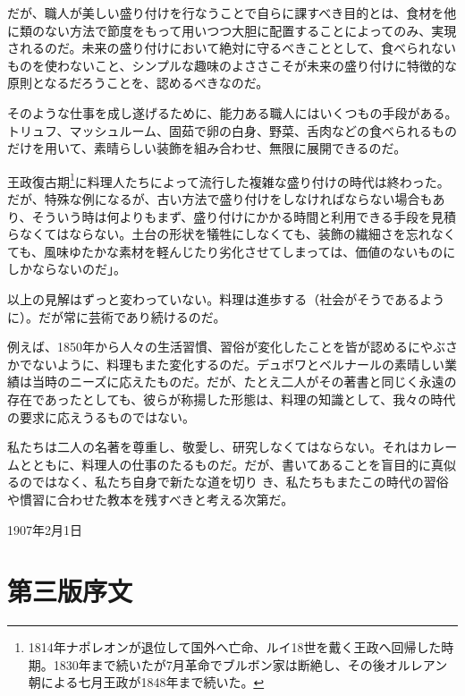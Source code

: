 だが、職人が美しい盛り付けを行なうことで自らに課すべき目的とは、食材を他に類のない方法で節度をもって用いつつ大胆に配置することによってのみ、実現されるのだ。未来の盛り付けにおいて絶対に守るべきこととして、食べられないものを使わないこと、シンプルな趣味のよささこそが未来の盛り付けに特徴的な原則となるだろうことを、認めるべきなのだ。

そのような仕事を成し遂げるために、能力ある職人にはいくつもの手段がある。トリュフ、マッシュルーム、固茹で卵の白身、野菜、舌肉などの食べられるものだけを用いて、素晴らしい装飾を組み合わせ、無限に展開できるのだ。

王政復古期\footnote{1814年ナポレオンが退位して国外へ亡命、ルイ18世を戴く王政へ回帰した時期。1830年まで続いたが7月革命でブルボン家は断絶し、その後オルレアン朝による七月王政が1848年まで続いた。}に料理人たちによって流行した複雑な盛り付けの時代は終わった。だが、特殊な例になるが、古い方法で盛り付けをしなければならない場合もあり、そういう時は何よりもまず、盛り付けにかかる時間と利用できる手段を見積らなくてはならない。土台の形状を犠牲にしなくても、装飾の繊細さを忘れなくても、風味ゆたかな素材を軽んじたり劣化させてしまっては、価値のないものにしかならないのだ」。

以上の見解はずっと変わっていない。料理は進歩する（社会がそうであるように）。だが常に芸術であり続けるのだ。

例えば、1850年から人々の生活習慣、習俗が変化したことを皆が認めるにやぶさかでないように、料理もまた変化するのだ。デュボワとベルナールの素晴しい業績は当時のニーズに応えたものだ。だが、たとえ二人がその著書と同じく永遠の存在であったとしても、彼らが称揚した形態は、料理の知識として、我々の時代の要求に応えうるものではない。

私たちは二人の名著を尊重し、敬愛し、研究しなくてはならない。それはカレームとともに、料理人の仕事のたるものだ。だが、書いてあることを盲目的に真似るのではなく、私たち自身で新たな道を切り
き、私たちもまたこの時代の習俗や慣習に合わせた教本を残すべきと考える次第だ。

\begin{flushright}
1907年2月1日
\end{flushright}

\newpage

\hypertarget{introduction-troisieme-edition}{%
\section{第三版序文}\label{introduction-troisieme-edition}}

\vspace*{1\zw}

